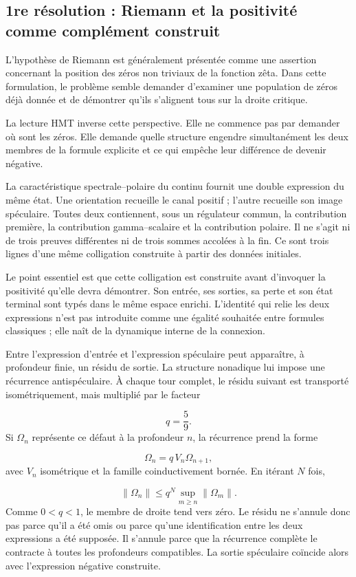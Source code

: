 \subsection{1re résolution : Riemann et la positivité comme complément construit}
L’hypothèse de Riemann est généralement présentée comme une assertion concernant la position des zéros non triviaux de la fonction zêta. Dans cette formulation, le problème semble demander d’examiner une population de zéros déjà donnée et de démontrer qu’ils s’alignent tous sur la droite critique.\par
La lecture HMT inverse cette perspective. Elle ne commence pas par demander où sont les zéros. Elle demande quelle structure engendre simultanément les deux membres de la formule explicite et ce qui empêche leur différence de devenir négative.\par
La caractéristique spectrale–polaire du continu fournit une double expression du même état. Une orientation recueille le canal positif ; l’autre recueille son image spéculaire. Toutes deux contiennent, sous un régulateur commun, la contribution première, la contribution gamma–scalaire et la contribution polaire. Il ne s’agit ni de trois preuves différentes ni de trois sommes accolées à la fin. Ce sont trois lignes d’une même colligation construite à partir des données initiales.\par
Le point essentiel est que cette colligation est construite avant d’invoquer la positivité qu’elle devra démontrer. Son entrée, ses sorties, sa perte et son état terminal sont typés dans le même espace enrichi. L’identité qui relie les deux expressions n’est pas introduite comme une égalité souhaitée entre formules classiques ; elle naît de la dynamique interne de la connexion.\par
Entre l’expression d’entrée et l’expression spéculaire peut apparaître, à profondeur finie, un résidu de sortie. La structure nonadique lui impose une récurrence antispéculaire. À chaque tour complet, le résidu suivant est transporté isométriquement, mais multiplié par le facteur\par
\[
q=\frac{5}{9}.
\]
Si \(\Omega_n\) représente ce défaut à la profondeur \(n\), la récurrence prend la forme\par
\[
\Omega_n=q\,V_n\Omega_{n+1},
\]
avec \(V_n\) isométrique et la famille coinductivement bornée. En itérant \(N\) fois,\par
\[
\|\Omega_n\|
\le q^N\sup_{m\ge n}\|\Omega_m\|.
\]
Comme \(0<q<1\), le membre de droite tend vers zéro. Le résidu ne s’annule donc pas parce qu’il a été omis ou parce qu’une identification entre les deux expressions a été supposée. Il s’annule parce que la récurrence complète le contracte à toutes les profondeurs compatibles. La sortie spéculaire coïncide alors avec l’expression négative construite.\par
